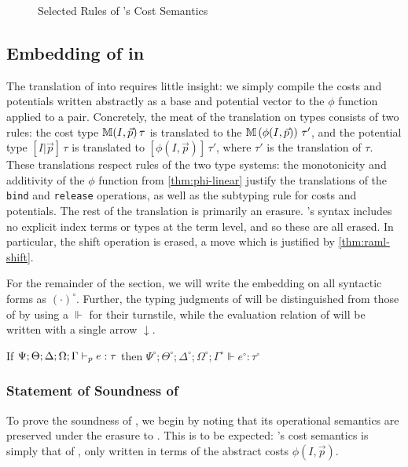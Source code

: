 \begin{figure}

\caption{Selected Rules of \dlambdaamor's Cost Semantics}
\label{fig:selected-sem-rules}
\end{figure}

\subsection{Embedding of \dlambdaamor in \lambdaamor}
\label{sec:dlambdaamor-embedding}
The translation of \dlambdaamor into \lambdaamor requires little insight: we simply compile the costs and potentials written abstractly as a base and potential vector to the $\phi$ function applied to a pair. Concretely, the meat of the translation on types consists of two rules: the \dlambdaamor cost type $\mathbb{M}(I,\vec{p}) \, \tau$ is translated to the \lambdaamor $\mathbb{M} \left(\phi(I,\vec{p})\right)\, \tau'$, and the potential type $[I|\vec{p}] \, \tau$ is translated to $\left[\phi(I,\vec{p})\right] \, \tau'$, where $\tau'$ is the translation of $\tau$. These translations respect rules of the two type systems: the monotonicity and additivity of the $\phi$ function from \autoref{thm:phi-linear} justify the translations of the \texttt{bind} and \texttt{release} operations, as well as the subtyping rule for costs and potentials. The rest of the translation is primarily an erasure. \lambdaamor's syntax includes no explicit index terms or types at the term level, and so these are all erased. In particular, the shift operation is erased, a move which is justified by \autoref{thm:raml-shift}.

For the remainder of the section, we will write the embedding on all syntactic forms as $(\cdot)^\circ$. Further, the typing judgments of \lambdaamor will be distinguished from those of \dlambdaamor by using a $\Vdash$ for their turnstile, while the evaluation relation of \lambdaamor will be written with a single arrow $\downarrow$.

\begin{theorem}
\label{thm:dla-trans-sound}
If $\Psi ; \Theta ; \Delta ; \Omega ; \Gamma \vdash_p e : \tau$ then $\Psi^\circ ; \Theta^\circ ; \Delta^\circ ; \Omega^\circ ; \Gamma^\circ \Vdash e^\circ : \tau^\circ$
\end{theorem}


\subsubsection{Statement of Soundness of \dlambdaamor}
To prove the soundness of \dlambdaamor, we begin by noting that its operational semantics are preserved under the erasure to \lambdaamor. This is to be expected: \dlambdaamor's cost semantics is simply that of \lambdaamor, only written in terms of the abstract costs $\phi(I,\vec{p})$.

